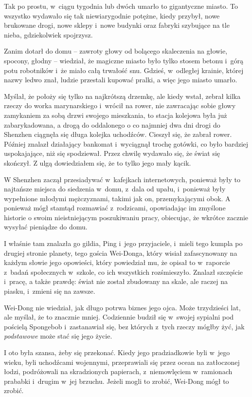 \documentclass[oneside,polish,11pt,rmheadings]{mwbk}
\begin{document}
Tak po prostu, w~ciągu tygodnia lub dwóch umarło to gigantyczne miasto. To wszystko wydawało się tak niewiarygodnie potężne, kiedy przybył, nowe brukowane drogi, nowe sklepy i~nowe budynki oraz fabryki szybujące na tle nieba, gdziekolwiek spojrzysz. 


Zanim dotarł do domu -- zawroty głowy od bolącego skaleczenia na głowie, spocony, głodny -- wiedział, że magiczne miasto było tylko stosem betonu i~górą potu robotników i~że miało całą trwałość snu. Gdzieś, w~odległej krainie, której nazwy ledwo znał, ludzie przestali kupować pralki, a więc jego miasto umarło. 


Myślał, że położy się tylko na najkrótszą drzemkę, ale kiedy wstał, zebrał kilka rzeczy do worka marynarskiego i~wrócił na rower, nie zawracając sobie głowy zamykaniem za sobą drzwi swojego mieszkania, to stacja kolejowa była już zabarykadowana, a drogą do oddalonego o co najmniej dwa dni drogi do Shenzhen ciągnęła się długa kolejka uchodźców. Cieszył się, że zabrał rower. Później znalazł działający bankomat i~wyciągnął trochę gotówki, co było bardziej uspokajające, niż się spodziewał. Przez chwilę wydawało się, że świat się skończył. Z ulgą dowiedziałem się, że to tylko jego mały kącik. 


W Shenzhen zaczął przesiadywać w~kafejkach internetowych, ponieważ były to najtańsze miejsca do siedzenia w~domu, z~dala od upału, i~ponieważ były wypełnione młodymi mężczyznami, takimi jak on, przemykającymi obok. A ponieważ mógł stamtąd rozmawiać z~rodzicami, opowiadając im zmyślone historie o swoim nieistniejącym poszukiwaniu pracy, obiecując, że wkrótce zacznie wysyłać pieniądze do domu. 


I właśnie tam znalazła go gildia, Ping i~jego przyjaciele, i~mieli tego kumpla po drugiej stronie planety, tego gościa Wei-Donga, który wisiał zafascynowany na każdym słowie jego opowieści, który powiedział mu, że opisał to w~raporcie z~badań społecznych w~szkole, co ich wszystkich rozśmieszyło. Znalazł szczęście i~pracę, a także prawdę: świat nie został zbudowany na skale, ale raczej na piasku, i~zmieni się na zawsze. 


Wei-Dong nie wiedział, jak długo potrwa biznes jego ojca. Może trzydzieści lat, ale myślał, że to znacznie mniej. Codziennie budził się w~swojej sypialni pod pościelą Spongebob i~zastanawiał się, bez których z~tych rzeczy mógłby żyć, jak \textit{podstawowe }może stać się jego życie. 


I oto była szansa, żeby się przekonać. Kiedy jego pradziadkowie byli w~jego wieku, byli uchodźcami wojennymi, przeprawiali się przez ocean na zatłoczonej łodzi, podróżowali na skradzionych papierach, z~niemowlęciem w~ramionach prababki i~drugim w~jej brzuchu. Jeżeli mogli to zrobić, Wei-Dong mógł to zrobić. 
\end{document}
